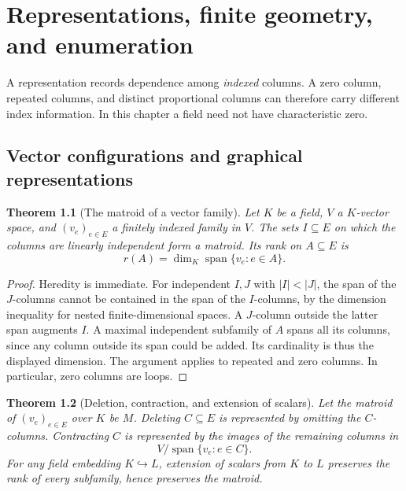 \documentclass[11pt,oneside,openany]{book}
\theoremstyle{plain}
\newtheorem{theorem}{Theorem}[chapter]
\theoremstyle{definition}
\theoremstyle{remark}
\begin{document}
\chapter{Representations, finite geometry, and enumeration}
\label{p204:ch11}

A representation records dependence among \emph{indexed} columns.
A zero column, repeated columns, and distinct proportional columns
can therefore carry different index information. In this chapter
a field need not have characteristic zero.

\section{Vector configurations and graphical representations}

\begin{theorem}[The matroid of a vector family]
\label{p204:W70}
Let \(K\) be a field, \(V\) a \(K\)-vector space, and
\((v_e)_{e\in E}\) a finitely indexed family in \(V\).
The sets \(I\subseteq E\) on which the columns are linearly
independent form a matroid. Its rank on \(A\subseteq E\) is
\[
 r(A)=\dim_K\operatorname{span}\{v_e:e\in A\}.
\]
\end{theorem}

\begin{proof}
Heredity is immediate. For independent \(I,J\) with \(|I|<|J|\),
the span of the \(J\)-columns cannot be contained in the span
of the \(I\)-columns, by the dimension inequality for nested
finite-dimensional spaces. A \(J\)-column outside the latter
span augments \(I\). A maximal independent subfamily of \(A\)
spans all its columns, since any column outside its span could
be added. Its cardinality is thus the displayed dimension.
The argument applies to repeated and zero columns. In particular,
zero columns are loops.
\end{proof}

\begin{theorem}[Deletion, contraction, and extension of scalars]
\label{p204:W71}
Let the matroid of \((v_e)_{e\in E}\) over \(K\) be \(M\).
Deleting \(C\subseteq E\) is represented by omitting the
\(C\)-columns. Contracting \(C\) is represented by the images
of the remaining columns in
\[
 V/\operatorname{span}\{v_e:e\in C\}.
\]
For any field embedding \(K\hookrightarrow L\), extension
of scalars from \(K\) to \(L\) preserves the rank of every
subfamily, hence preserves the matroid.
\end{theorem}
\end{document}
